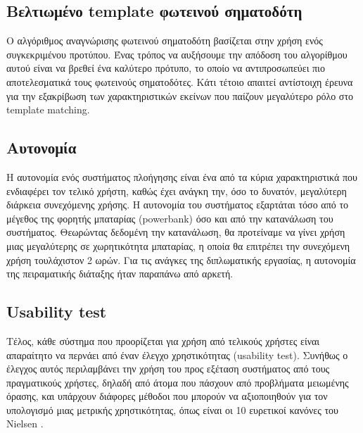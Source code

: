 \subsection{Βελτιωμένο template φωτεινού σηματοδότη}
Ο αλγόριθμος αναγνώρισης φωτεινού σηματοδότη βασίζεται στην χρήση ενός συγκεκριμένου προτύπου. Ένας τρόπος να αυξήσουμε την απόδοση του αλγορίθμου αυτού είναι να βρεθεί ένα καλύτερο πρότυπο, το οποίο να αντιπροσωπεύει πιο αποτελεσματικά τους φωτεινούς σηματοδότες. Κάτι τέτοιο απαιτεί αντίστοιχη έρευνα για την εξακρίβωση των χαρακτηριστικών εκείνων που παίζουν μεγαλύτερο ρόλο στο template matching.

\subsection{Αυτονομία}
Η αυτονομία ενός συστήματος πλοήγησης είναι ένα από τα κύρια χαρακτηριστικά που ενδιαφέρει τον τελικό χρήστη, καθώς έχει ανάγκη την, όσο το δυνατόν, μεγαλύτερη διάρκεια συνεχόμενης χρήσης.
Η αυτονομία του συστήματος εξαρτάται τόσο από το μέγεθος της φορητής μπαταρίας (powerbank) όσο και από την κατανάλωση του συστήματος. Θεωρώντας δεδομένη την κατανάλωση, θα προτείναμε να γίνει χρήση μιας μεγαλύτερης σε χωρητικότητα μπαταρίας, η οποία θα επιτρέπει την συνεχόμενη χρήση τουλάχιστον 2 ωρών. Για τις ανάγκες της διπλωματικής εργασίας, η αυτονομία της πειραματικής διάταξης ήταν παραπάνω από αρκετή.

\subsection{Usability test}
Τέλος, κάθε σύστημα που προορίζεται για χρήση από τελικούς χρήστες είναι απαραίτητο να περνάει από έναν έλεγχο χρηστικότητας (usability test). Συνήθως ο έλεγχος αυτός περιλαμβάνει την χρήση του προς εξέταση συστήματος από τους πραγματικούς χρήστες, δηλαδή από άτομα που πάσχουν από προβλήματα μειωμένης όρασης, και υπάρχουν διάφορες μέθοδοι που μπορούν να αξιοποιηθούν για τον υπολογισμό μιας μετρικής χρηστικότητας, όπως είναι οι 10 ευρετικοί κανόνες του Nielsen \cite{nielsen1990}.